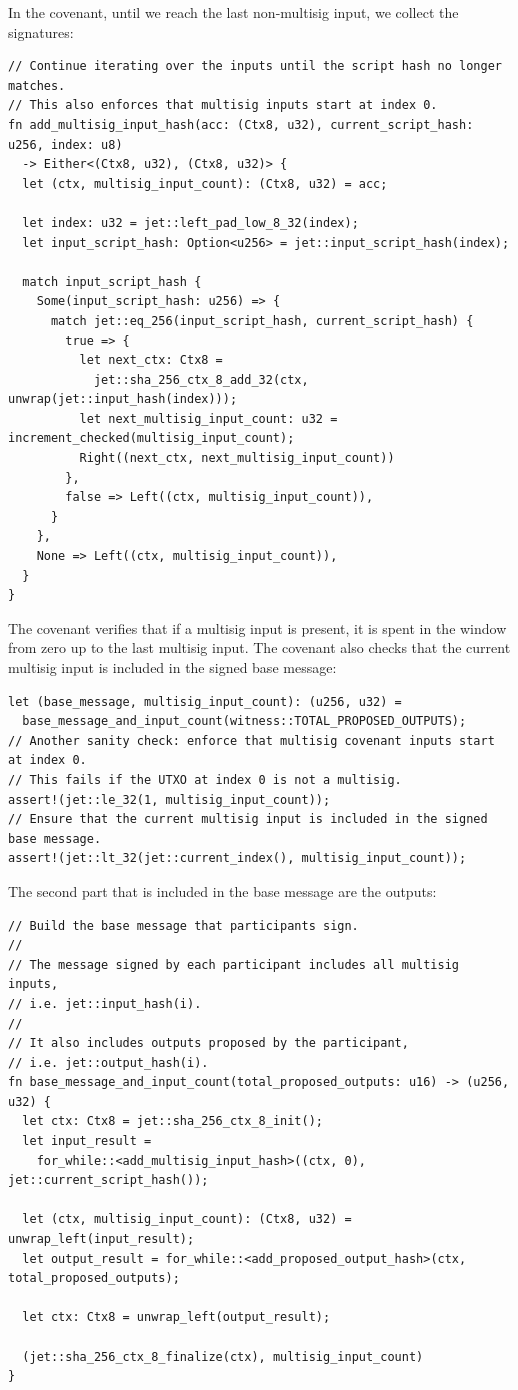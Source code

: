 \documentclass[11pt]{article}
\begin{document}
    In the covenant, until we reach the last non-multisig input, we collect the signatures:

    \begin{lstlisting}
// Continue iterating over the inputs until the script hash no longer matches.
// This also enforces that multisig inputs start at index 0.
fn add_multisig_input_hash(acc: (Ctx8, u32), current_script_hash: u256, index: u8)
  -> Either<(Ctx8, u32), (Ctx8, u32)> {
  let (ctx, multisig_input_count): (Ctx8, u32) = acc;

  let index: u32 = jet::left_pad_low_8_32(index);
  let input_script_hash: Option<u256> = jet::input_script_hash(index);

  match input_script_hash {
    Some(input_script_hash: u256) => {
      match jet::eq_256(input_script_hash, current_script_hash) {
        true => {
          let next_ctx: Ctx8 =
            jet::sha_256_ctx_8_add_32(ctx, unwrap(jet::input_hash(index)));
          let next_multisig_input_count: u32 = increment_checked(multisig_input_count);
          Right((next_ctx, next_multisig_input_count))
        },
        false => Left((ctx, multisig_input_count)),
      }
    },
    None => Left((ctx, multisig_input_count)),
  }
}
    \end{lstlisting}

    The covenant verifies that if a multisig input is present, it is spent in the window from zero up to the last multisig input. The covenant also checks that the current multisig input is included in the signed base message:

    \begin{lstlisting}
let (base_message, multisig_input_count): (u256, u32) =
  base_message_and_input_count(witness::TOTAL_PROPOSED_OUTPUTS);
// Another sanity check: enforce that multisig covenant inputs start at index 0.
// This fails if the UTXO at index 0 is not a multisig.
assert!(jet::le_32(1, multisig_input_count));
// Ensure that the current multisig input is included in the signed base message.
assert!(jet::lt_32(jet::current_index(), multisig_input_count));
    \end{lstlisting}

    The second part that is included in the base message are the outputs:

    \begin{lstlisting}
// Build the base message that participants sign.
//
// The message signed by each participant includes all multisig inputs,
// i.e. jet::input_hash(i).
//
// It also includes outputs proposed by the participant,
// i.e. jet::output_hash(i).
fn base_message_and_input_count(total_proposed_outputs: u16) -> (u256, u32) {
  let ctx: Ctx8 = jet::sha_256_ctx_8_init();
  let input_result =
    for_while::<add_multisig_input_hash>((ctx, 0), jet::current_script_hash());

  let (ctx, multisig_input_count): (Ctx8, u32) = unwrap_left(input_result);
  let output_result = for_while::<add_proposed_output_hash>(ctx, total_proposed_outputs);

  let ctx: Ctx8 = unwrap_left(output_result);

  (jet::sha_256_ctx_8_finalize(ctx), multisig_input_count)
}
    \end{lstlisting}
\end{document}
